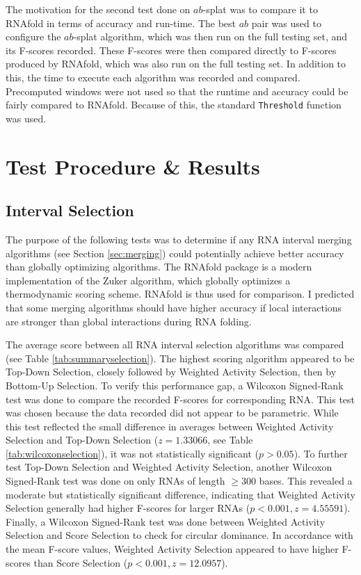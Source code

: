 \documentclass{cshonours}
\begin{document}
The motivation for the second test done on $ab$-splat was to compare it to RNAfold in terms of accuracy and run-time. The best $ab$ pair was used to configure the $ab$-splat algorithm, which was then run on the full testing set, and its F-scores recorded. These F-scores were then compared directly to F-scores produced by RNAfold, which was also run on the full testing set. In addition to this, the time to execute each algorithm was recorded and compared. Precomputed windows were not used so that the runtime and accuracy could be fairly compared to RNAfold. Because of this, the standard \texttt{Threshold} function was used.


\section{Test Procedure \& Results}

\subsection{Interval Selection}
The purpose of the following tests was to determine if any RNA interval merging algorithms (see Section \ref{sec:merging}) could potentially achieve better accuracy than globally optimizing algorithms. The RNAfold package is a modern implementation of the Zuker algorithm, which globally optimizes a thermodynamic scoring scheme. RNAfold is thus used for comparison. I predicted that some merging algorithms should have higher accuracy if local interactions are stronger than global interactions during RNA folding.

The average score between all RNA interval selection algorithms was compared (see Table \ref{tab:summaryselection}). The highest scoring algorithm appeared to be Top-Down Selection, closely followed by Weighted Activity Selection, then by Bottom-Up Selection. To verify this performance gap, a Wilcoxon Signed-Rank test was done to compare the recorded F-scores for corresponding RNA. This test was chosen because the data recorded did not appear to be parametric. While this test reflected the small difference in averages between Weighted Activity Selection and Top-Down Selection ($z = 1.33066$, see Table \ref{tab:wilcoxonselection}), it was not statistically significant ($p > 0.05$). To further test Top-Down Selection and Weighted Activity Selection, another Wilcoxon Signed-Rank test was done on only RNAs of length $\geq 300$ bases. This revealed a moderate but statistically significant difference, indicating that Weighted Activity Selection generally had higher F-scores for larger RNAs ($p < 0.001, z = 4.55591$). Finally, a Wilcoxon Signed-Rank test was done between Weighted Activity Selection and Score Selection to check for circular dominance. In accordance with the mean F-score values, Weighted Activity Selection appeared to have higher F-scores than Score Selection ($p < 0.001, z = 12.0957$).
\end{document}
